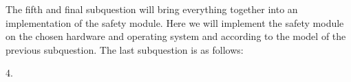 \documentclass[12pt]{scrreprt}
\begin{document}
The fifth and final subquestion will bring everything together into an implementation of the safety module. Here we will implement the safety module on the chosen hardware and operating system and according to the model of the previous subquestion. The last subquestion is as follows:

\begin{flushleft}
4. \textit{\sqfour}
\end{flushleft}

%
%
%
%
%
\end{document}
